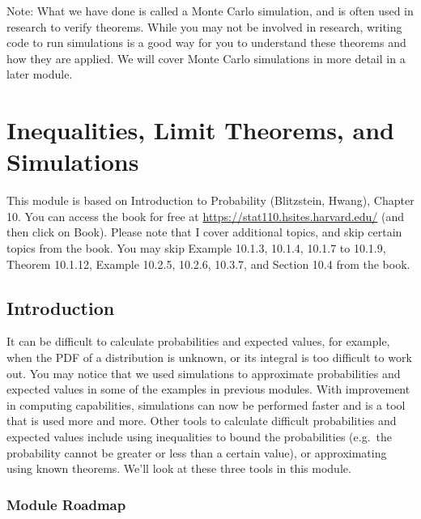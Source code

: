 \documentclass[
]{book}
\begin{document}
Note: What we have done is called a Monte Carlo simulation, and is often used in research to verify theorems. While you may not be involved in research, writing code to run simulations is a good way for you to understand these theorems and how they are applied. We will cover Monte Carlo simulations in more detail in a later module.

\hypertarget{inequalities-limit-theorems-and-simulations}{%
\chapter{Inequalities, Limit Theorems, and Simulations}\label{inequalities-limit-theorems-and-simulations}}

This module is based on Introduction to Probability (Blitzstein, Hwang), Chapter 10. You can access the book for free at \url{https://stat110.hsites.harvard.edu/} (and then click on Book). Please note that I cover additional topics, and skip certain topics from the book. You may skip Example 10.1.3, 10.1.4, 10.1.7 to 10.1.9, Theorem 10.1.12, Example 10.2.5, 10.2.6, 10.3.7, and Section 10.4 from the book.

\hypertarget{introduction-2}{%
\section{Introduction}\label{introduction-2}}

It can be difficult to calculate probabilities and expected values, for example, when the PDF of a distribution is unknown, or its integral is too difficult to work out. You may notice that we used simulations to approximate probabilities and expected values in some of the examples in previous modules. With improvement in computing capabilities, simulations can now be performed faster and is a tool that is used more and more. Other tools to calculate difficult probabilities and expected values include using inequalities to bound the probabilities (e.g.~the probability cannot be greater or less than a certain value), or approximating using known theorems. We'll look at these three tools in this module.

\hypertarget{module-roadmap-4}{%
\subsection{Module Roadmap}\label{module-roadmap-4}}
\end{document}
